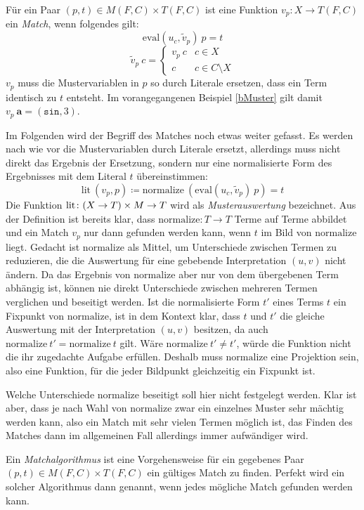 \begin{definition} \label{defMatch}
Für ein Paar $(p, t) \in M(F, C) \times T(F, C)$ ist eine Funktion $v_p \colon X \rightarrow T(F, C)$ ein \emph{Match}, wenn folgendes gilt:
$$\mathrm{eval}(u_c, \tilde v_p)~ p = t$$
$$\tilde v_p~ c = \begin{cases}
	v_p~ c & c \in X\\
	c      & c \in C \setminus X
\end{cases}$$
$v_p$ muss die Mustervariablen in $p$ so durch Literale ersetzen, dass ein Term identisch zu $t$ entsteht. 
Im vorangegangenen Beispiel \ref{bMuster} gilt damit $v_p~ \mathbf a = (\texttt{sin}, 3)$.

Im Folgenden wird der Begriff des Matches noch etwas weiter gefasst. Es werden nach wie vor die Mustervariablen durch Literale ersetzt, allerdings muss nicht direkt das Ergebnis der Ersetzung, sondern nur eine normalisierte Form des Ergebnisses mit dem Literal $t$ übereinstimmen:
$$\mathrm{lit}~(v_p, p) \coloneqq \mathrm{normalize}~(\mathrm{eval}(u_c, \tilde v_p)~ p) = t$$
Die Funktion $\mathrm{lit} \colon \paren*{X \rightarrow T} \times M \rightarrow T$ wird als \emph{Musterauswertung} bezeichnet.
Aus der Definition ist bereits klar, dass $\mathrm{normalize} \colon T \rightarrow T$ Terme auf Terme abbildet und ein Match $v_p$ nur dann gefunden werden kann, wenn $t$ im Bild von $\mathrm{normalize}$ liegt. 
Gedacht ist $\mathrm{normalize}$ als Mittel, um Unterschiede zwischen Termen zu reduzieren, die die Auswertung für eine gebebende Interpretation $(u, v)$ nicht ändern. Da das Ergebnis von $\mathrm{normalize}$ aber nur von dem übergebenen Term abhängig ist, können nie direkt Unterschiede zwischen mehreren Termen verglichen und beseitigt werden. Ist die normalisierte Form $t'$ eines Terms $t$ ein Fixpunkt von $\mathrm{normalize}$, ist in dem Kontext klar, dass $t$ und $t'$ die gleiche Auswertung mit der Interpretation $(u, v)$ besitzen, da auch $\mathrm{normalize}~t' = \mathrm{normalize}~t$ gilt. Wäre $\mathrm{normalize}~t' \neq t'$, würde die Funktion nicht die ihr zugedachte Aufgabe erfüllen. Deshalb muss $\mathrm{normalize}$ eine Projektion sein, also eine Funktion, für die jeder Bildpunkt gleichzeitig ein Fixpunkt ist. 

Welche Unterschiede $\mathrm{normalize}$ beseitigt soll hier nicht festgelegt werden. Klar ist aber, dass je nach Wahl von $\mathrm{normalize}$ zwar ein einzelnes Muster sehr mächtig werden kann, also ein Match mit sehr vielen Termen möglich ist, das Finden des Matches dann im allgemeinen Fall allerdings immer aufwändiger wird. 

\end{definition}

Ein \emph{Matchalgorithmus} ist eine Vorgehensweise für ein gegebenes Paar $(p, t) \in M(F, C) \times T(F, C)$ ein gültiges Match zu finden. Perfekt wird ein solcher Algorithmus dann genannt, wenn jedes mögliche Match gefunden werden kann.


